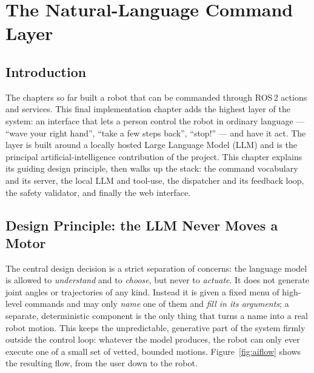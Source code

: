 \chapter{The Natural-Language Command Layer}
\label{chap:ai}

\section{Introduction}
The chapters so far built a robot that can be commanded through ROS\,2
actions and services. This final implementation chapter adds the highest
layer of the system: an interface that lets a person control the robot in
ordinary language --- ``wave your right hand'', ``take a few steps back'',
``stop!'' --- and have it act. The layer is built around a locally hosted
Large Language Model (LLM) and is the principal artificial-intelligence
contribution of the project. This chapter explains its guiding design
principle, then walks up the stack: the command vocabulary and its
server, the local LLM and tool-use, the dispatcher and its feedback loop,
the safety validator, and finally the web interface.

\section{Design Principle: the LLM Never Moves a Motor}
\label{sec:ai-principle}
The central design decision is a strict separation of concerns: the
language model is allowed to \emph{understand} and to \emph{choose}, but
never to \emph{actuate}. It does not generate joint angles or trajectories
of any kind. Instead it is given a fixed menu of high-level commands and
may only \emph{name} one of them and \emph{fill in its arguments}; a
separate, deterministic component is the only thing that turns a name into
a real robot motion. This keeps the unpredictable, generative part of the
system firmly outside the control loop: whatever the model produces, the
robot can only ever execute one of a small set of vetted, bounded motions.
Figure~\ref{fig:aiflow} shows the resulting flow, from the user down to
the robot.

